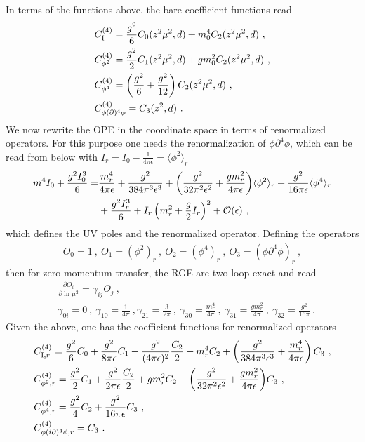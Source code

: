 \documentclass[a4paper,11pt]{article}
\begin{document}
In terms of the functions above, the bare coefficient functions read
\begin{align}
&C_{\rm I}^{(4)}=\frac{g^2}{6}C_0(z^2\mu^2,d)+m_0^4C_2(z^2\mu^2,d) \ , \\
&C_{\phi^2}^{(4)}=\frac{g^2}{2}C_1(z^2\mu^2,d)+gm_0^2C_2(z^2\mu^2,d) \ , \\ 
&C_{\phi^4}^{(4)}=\left(\frac{g^2}{6}+\frac{g^2}{12}\right)C_2(z^2\mu^2,d) \ , \\
&C_{\phi(\partial)^4\phi}^{(4)}=C_3(z^2,d) \ .
\end{align}
We now rewrite the OPE in the coordinate space in terms of renormalized operators. For this purpose one needs the renormalization of $\phi\partial^4\phi$, which can be read from below with $I_r=I_0-\frac{1}{4\pi \epsilon}=\langle \phi^2\rangle_r$
\begin{align}
m^4I_0+\frac{g^2I_0^3}{6}=&\frac{m_r^4}{4\pi \epsilon}+\frac{g^2}{384 \pi ^3 \epsilon^3}+\bigg(\frac{g^2}{32 \pi ^2 \epsilon^2}+\frac{g m_r^2}{4 \pi  \epsilon}\bigg)\langle\phi^2\rangle_r+\frac{g^2}{16\pi \epsilon}\langle \phi^4 \rangle_r\nonumber \\ &+\frac{g^2 I_r^3}{6}+I_r\left(m_r^2+\frac{g}{2}I_r\right)^2+{\cal O}(\epsilon) \ ,
\end{align}
which defines the UV poles and the renormalized operator. Defining the operators 
\begin{align}
O_0=1 \ , \ O_1=(\phi^2)_r \ , \ O_2=(\phi^4)_r \ , \ O_3=(\phi\partial^4\phi)_r \ ,
\end{align}
then for zero momentum transfer, the RGE are two-loop exact and read 
\begin{align}
&\frac{\partial O_i}{\partial \ln \mu^2}=\gamma_{ij}O_j \ ,  \\ 
&\gamma_{0i}=0 \ , \ \gamma_{10}=\frac{1}{4\pi} \ , \gamma_{21}=\frac{3}{2\pi} \ , \ \gamma_{30}=\frac{m_r^4}{4\pi} \ ,  \ \gamma_{31}=\frac{gm_r^2}{4\pi} \ ,  \ \gamma_{32}=\frac{g^2}{16\pi} \ .
\end{align}
Given the above, one has the coefficient functions for renormalized operators 
\begin{align}
& C_{{\rm I},r}^{(4)}=\frac{g^2}{6}C_0+\frac{g^2}{8\pi \epsilon}C_1+\frac{g^2}{(4\pi \epsilon)^2}\frac{C_2}{2}+m_r^4C_2+\left(\frac{g^2}{384 \pi ^3 \epsilon^3}+\frac{ m_r^4}{4 \pi  \epsilon}\right)C_3 \ , \\
& C_{\phi^2,r}^{(4)}=\frac{g^2}{2}C_1+\frac{g^2}{2\pi \epsilon}\frac{C_2}{2}+gm_r^2C_2+\bigg(\frac{g^2}{32 \pi ^2 \epsilon^2}+\frac{g m_r^2}{4 \pi  \epsilon}\bigg)C_3 \ , \\
& C_{\phi^4,r}^{(4)}=\frac{g^2}{4}C_2+\frac{g^2}{16 \pi  \epsilon}C_3 \ , \\
& C_{\phi(i\partial)^4\phi,r}^{(4)}=C_3 \ .
\end{align}
\end{document}
